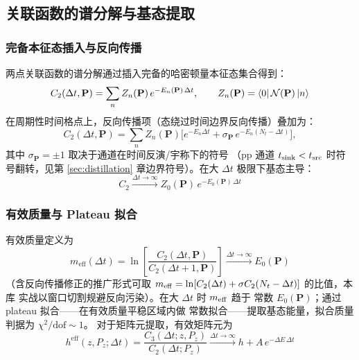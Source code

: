 \documentclass[11pt,a4paper]{ctexart}
\begin{document}
\subsection{关联函数的谱分解与基态提取}

\subsubsection{完备本征态插入与反向传播}

两点关联函数的谱分解通过插入完备的哈密顿量本征态集合得到：
\begin{equation}\label{eq:C2_spectral}
C_2(\Delta t, \mathbf{P}) = \sum_n Z_n(\mathbf{P})\,
e^{-E_n(\mathbf{P})\,\Delta t},
\qquad Z_n(\mathbf{P}) = \bra{0}\mathcal N(\mathbf P)\ket n
\end{equation}
在周期性时间格点上，反向传播项（态绕过时间边界反向传播）叠加为：
\begin{equation}
C_2(\Delta t,\mathbf P) = \sum_n Z_n(\mathbf P)
\bigl[e^{-E_n\Delta t} + \sigma_{\mathbf P}\,e^{-E_n(N_t-\Delta t)}
\bigr],
\end{equation}
其中 $\sigma_{\mathbf P}=\pm1$ 取决于通道在时间反演/宇称下的符号
（pp 通道 $t_{\rm sink}<t_{\rm src}$ 时符号翻转，见第
\ref{sec:distillation} 章边界符号）。在大 $\Delta t$ 极限下基态主导：
\begin{equation}
C_2 \xrightarrow{\Delta t\to\infty} Z_0(\mathbf P)\,
e^{-E_0(\mathbf P)\,\Delta t}
\end{equation}

\subsubsection{有效质量与 Plateau 拟合}

有效质量定义为
\begin{equation}
m_{\text{eff}}(\Delta t) = \ln\!\left[
\frac{C_2(\Delta t, \mathbf{P})}{C_2(\Delta t+1, \mathbf{P})} \right]
\xrightarrow{\Delta t\to\infty} E_0(\mathbf P)
\end{equation}
（含反向传播修正的推广形式可取
$m_{\rm eff}=\ln[C_2(\Delta t)+\sigma C_2(N_t-\Delta t)]$ 的比值，本库
实战以窗口切割规避反向污染）。在大 $\Delta t$ 时 $m_{\rm eff}$ 趋于
常数 $E_0(\mathbf{P})$；通过 plateau 拟合——在有效质量平稳区域内做
常数拟合——提取基态能量，拟合质量判据为 $\chi^2/\mathrm{dof}\sim1$。
对于矩阵元提取，有效矩阵元为
\begin{equation}
h^{\text{eff}}(z,P_z;\Delta t) =
\frac{C_3(\Delta t; z, P_z)}{C_2(\Delta t; P_z)}
\xrightarrow{\Delta t\to\infty} h + A\,e^{-\Delta E\,\Delta t}
\end{equation}
\end{document}
